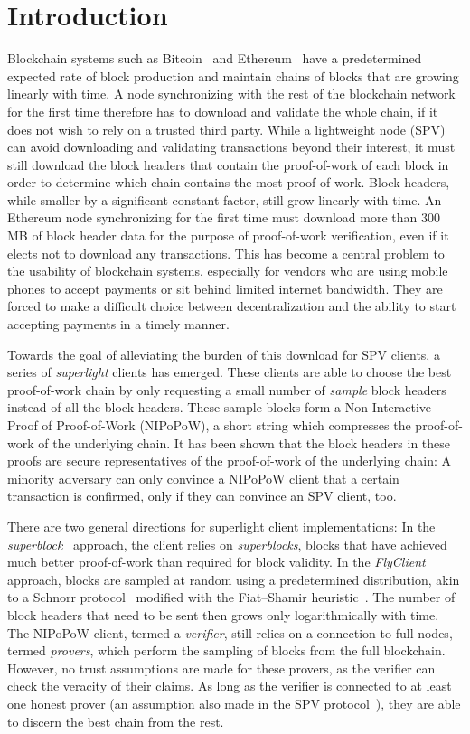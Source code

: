 \section{Introduction}
Blockchain systems such as Bitcoin~\cite{nakamoto} and
Ethereum~\cite{buterin,wood} have a predetermined expected rate of block
production and maintain chains of blocks that are growing linearly
with time. A node synchronizing with the rest of the blockchain
network for the first time therefore has to download and validate the whole
chain, if it does not wish to rely on a trusted third party. While a lightweight
node (SPV) can avoid downloading and validating transactions beyond their
interest, it must still download the block headers that contain the
proof-of-work\cite{pow} of each block in order to determine which chain contains
the most proof-of-work. Block headers, while smaller by a significant constant
factor, still grow linearly with time. An Ethereum node synchronizing for the
first time must download more than $300$ MB of block header data for the purpose
of proof-of-work verification, even if it elects not to download any
transactions. This has become a central problem to the usability of blockchain
systems, especially for vendors who are using mobile phones to accept payments
or sit behind limited internet bandwidth. They are forced to make a difficult
choice between decentralization and the ability to start accepting payments in a
timely manner.

Towards the goal of alleviating the burden of this download for SPV clients, a
series of \emph{superlight} clients has emerged. These clients are able to
choose the best proof-of-work chain by only requesting a small number of
\emph{sample} block headers instead of all the block headers. These sample
blocks form a Non-Interactive Proof of Proof-of-Work (NIPoPoW), a short string
which compresses the proof-of-work of the underlying chain. It has been shown
that the block headers in these proofs are secure representatives of the
proof-of-work of the underlying chain: A minority adversary can only convince a
NIPoPoW client that a certain transaction is confirmed, only if they can
convince an SPV client, too.

There are two general directions for superlight client implementations: In the
\emph{superblock}~\cite{nipopow,compactsuperblocks} approach, the client
relies on \emph{superblocks}, blocks that have achieved much better
proof-of-work than required for block validity. In the
\emph{FlyClient}~\cite{flyclient} approach, blocks are sampled at random using a
predetermined distribution, akin to a Schnorr protocol~\cite{schnorr} modified
with the Fiat--Shamir heuristic~\cite{fiatshamir}. The number of block headers
that need to be sent then grows only logarithmically with time. The NIPoPoW
client, termed a \emph{verifier}, still relies on a connection to full nodes,
termed \emph{provers}, which perform the sampling of blocks from the full
blockchain. However, no trust assumptions are made for these provers, as the
verifier can check the veracity of their claims. As long as the verifier is
connected to at least one honest prover (an assumption also made in the SPV
protocol~\cite{eclipse,eclipse-ethereum}), they are able to discern the best chain from the rest.

